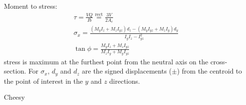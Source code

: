 Moment to stress:
\begin{gather*}
    \tau = \frac{VQ}{Ib} \overset{\text{rect}}{=} \frac{3V}{2A_c} \\
    \sigma_{x} = \frac{(M_y I_z + M_z I_{yz})d_{z} - (M_y I_{yz} + M_z I_y)d_{y}}{I_y I_z - I_{yz}^2} \\
    \tan{\phi} = \frac{M_y I_z + M_z I_{yz}}{M_z I_y + M_y I_{yz}} 
\end{gather*}
stress is maximum at the furthest point from the neutral axis on the cross-section. For $\sigma_x$, 
$d_y$ and $d_z$ are the signed displacements ($\pm$) from the centroid to the point of interest in the $y$ and $z$ directions.

Cheesy 

